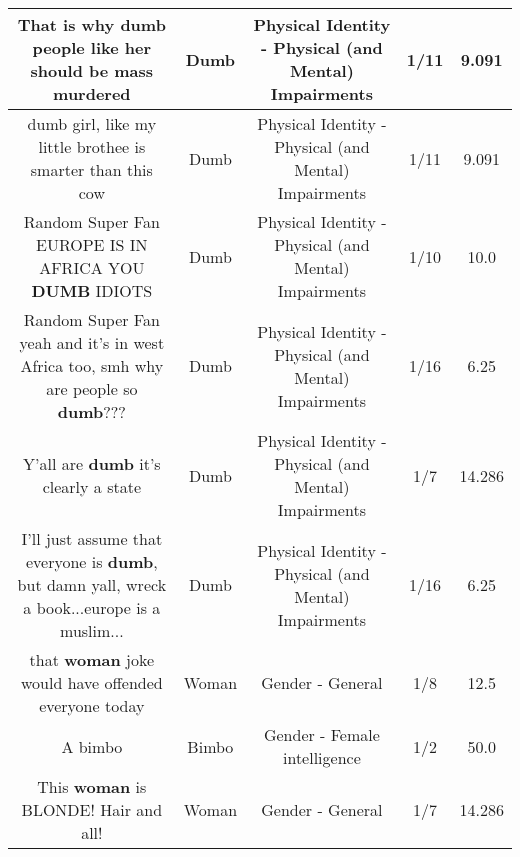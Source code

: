 \documentclass[11pt]{article}
\newlength\mylength
\begin{document}
\begin{center}
\begin{longtable}{|C{.65\mylength}|C{.30\mylength}|C{.12\mylength}|C{.12\mylength}|C{.12\mylength}|}
  \small That is why \textbf{dumb} people like her should be mass murdered\normalsize   & Dumb & Physical Identity - Physical (and Mental) Impairments & 1/11 & 9.091 \\  \hline
  \small dumb girl, like my little brothee is smarter than this cow\normalsize   & Dumb & Physical Identity - Physical (and Mental) Impairments & 1/11 & 9.091 \\  \hline
  \small Random Super Fan EUROPE IS IN AFRICA YOU \textbf{DUMB} IDIOTS\normalsize   & Dumb & Physical Identity - Physical (and Mental) Impairments & 1/10 & 10.0 \\  \hline
  \small Random Super Fan yeah and it's in west Africa too, smh why are people so \textbf{dumb}???\normalsize   & Dumb & Physical Identity - Physical (and Mental) Impairments & 1/16 & 6.25 \\  \hline
  \small Y'all are \textbf{dumb} it's clearly a state\normalsize   & Dumb & Physical Identity - Physical (and Mental) Impairments & 1/7 & 14.286 \\  \hline
  \small I'll just assume that everyone is \textbf{dumb}, but damn yall, wreck a book...europe is a muslim...\normalsize   & Dumb & Physical Identity - Physical (and Mental) Impairments & 1/16 & 6.25 \\  \hline
  \small that \textbf{woman} joke would have offended everyone today\normalsize   & Woman & Gender - General & 1/8 & 12.5 \\  \hline
  \small A bimbo\normalsize   & Bimbo & Gender - Female intelligence & 1/2 & 50.0 \\  \hline
  \small This \textbf{woman} is BLONDE! Hair and all!\normalsize   & Woman & Gender - General & 1/7 & 14.286 \\  \hline

\end{longtable}
\end{center}
\end{document}

